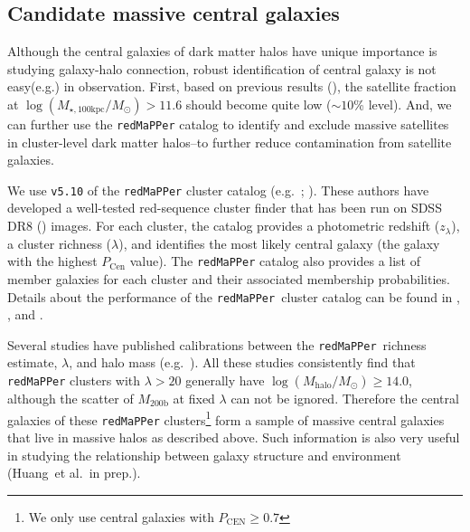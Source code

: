\documentclass[a4paper,fleqn,usenatbib]{mnras}
\def\etal{{\ et al.~}}
\def\redm{\texttt{redMaPPer}}
\def\mhalo{{$M_{\mathrm{200b}}$}}
\def\logmtot{{$\log (M_{\star,100\mathrm{kpc}}/M_{\odot})$}}
\begin{document}
\subsection{Candidate massive central galaxies}
    \label{ssec:redmapper}
    
    Although the central galaxies of dark matter halos have unique importance is 
    studying galaxy-halo connection, robust identification of central galaxy is 
    not easy(e.g.\citealt{Yang2007}) in observation.
    First, based on previous results (\citealt{Reid2014, Hoshino2015, Saito2016}),
    the satellite fraction at \logmtot{}$> 11.6$ should become quite low 
    ($\sim 10$\% level). 
    And, we can further use the \redm{} catalog to identify and exclude massive 
    satellites in cluster-level dark matter halos--to further reduce contamination
    from satellite galaxies.
    
    We use \texttt{v5.10} of the \redm{} cluster  catalog
    (e.g.\ \citealt{Rykoff2014}; \citealt{Rozo2015b}). 
    These authors have developed a well-tested red-sequence cluster finder that has 
    been run on SDSS DR8 (\citealt{SDSSDR8}) images. 
    For each cluster, the catalog provides a photometric redshift ($z_{\lambda}$), a 
    cluster richness ($\lambda$), and identifies the most likely central galaxy (the 
    galaxy with the highest $P_{\mathrm{Cen}}$ value). 
    The \redm{}{} catalog also provides a list of member galaxies for each cluster and 
    their associated membership probabilities. 
    Details about the performance of the \redm{}~cluster catalog can be found in 
    \citet{Rozo2014}, \citet{Rozo2015a}, and \citet{Rozo2015b}. 
    
    Several studies have published calibrations between the \redm{}~richness estimate, 
    $\lambda$, and halo mass (e.g.\ \citealt{Saro2015, Farahi2016, Simet2016, 
    Melchior2016}). 
    All these studies consistently find that \redm{} clusters with $\lambda > 20$ 
    generally have $\log (M_{\mathrm{halo}}/M_{\odot}) \geq 14.0$, although the scatter 
    of \mhalo{} at fixed $\lambda$ can not be ignored.
    Therefore the central galaxies of these \redm{} clusters\footnote{We only use 
    central galaxies with $P_{\mathrm{CEN}} \geq 0.7$} form a sample of massive central 
    galaxies that live in massive halos as described above.
    Such information is also very useful in studying the relationship between galaxy
    structure and environment (Huang\etal in prep.).

\end{document}
